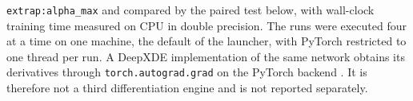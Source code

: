 \documentclass[subscriptcorrection,upint,varvw,barcolor=Goldenrod3,mathalfa=cal=euler,balance,hyphenate,french,pdf-a]{asmejour} %
\begin{document}
\texttt{extrap:alpha\_max} and compared by the paired test below, with wall-clock
training time measured on CPU in double precision. The runs were executed four at a
time on one machine, the default of the launcher, with PyTorch restricted to one thread
per run.
A DeepXDE implementation of the same network obtains its derivatives through
\texttt{torch.autograd.grad} on the PyTorch backend \citep{lu2021}. It is therefore not a third
differentiation engine and is not reported separately.
\end{document}
